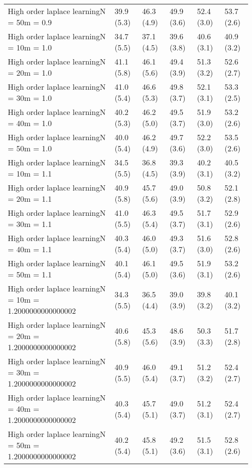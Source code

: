 \documentclass{article}
\begin{document}
\begin{table*}[t!]
\begin{center}
\begin{small}
\begin{sc}
\begin{tabular}{llllll}
High order laplace learningN = 50m = 0.9&39.9 (5.3)      &46.3 (4.9)      &49.9 (3.6)      &52.4 (3.0)      &53.7 (2.6)      \\
High order laplace learningN = 10m = 1.0&34.7 (5.5)      &37.1 (4.5)      &39.6 (3.8)      &40.6 (3.1)      &40.9 (3.2)      \\
High order laplace learningN = 20m = 1.0&41.1 (5.8)      &46.1 (5.6)      &49.4 (3.9)      &51.3 (3.2)      &52.6 (2.7)      \\
High order laplace learningN = 30m = 1.0&41.0 (5.4)      &46.6 (5.3)      &49.8 (3.7)      &52.1 (3.1)      &53.3 (2.5)      \\
High order laplace learningN = 40m = 1.0&40.2 (5.3)      &46.2 (5.0)      &49.5 (3.7)      &51.9 (3.0)      &53.2 (2.6)      \\
High order laplace learningN = 50m = 1.0&40.0 (5.4)      &46.2 (4.9)      &49.7 (3.6)      &52.2 (3.0)      &53.5 (2.6)      \\
High order laplace learningN = 10m = 1.1&34.5 (5.5)      &36.8 (4.5)      &39.3 (3.9)      &40.2 (3.1)      &40.5 (3.2)      \\
High order laplace learningN = 20m = 1.1&40.9 (5.8)      &45.7 (5.6)      &49.0 (3.9)      &50.8 (3.2)      &52.1 (2.8)      \\
High order laplace learningN = 30m = 1.1&41.0 (5.5)      &46.3 (5.4)      &49.5 (3.7)      &51.7 (3.1)      &52.9 (2.6)      \\
High order laplace learningN = 40m = 1.1&40.3 (5.4)      &46.0 (5.0)      &49.3 (3.7)      &51.6 (3.0)      &52.8 (2.6)      \\
High order laplace learningN = 50m = 1.1&40.1 (5.4)      &46.1 (5.0)      &49.5 (3.6)      &51.9 (3.1)      &53.2 (2.6)      \\
High order laplace learningN = 10m = 1.2000000000000002&34.3 (5.5)      &36.5 (4.4)      &39.0 (3.9)      &39.8 (3.2)      &40.1 (3.2)      \\
High order laplace learningN = 20m = 1.2000000000000002&40.6 (5.8)      &45.3 (5.6)      &48.6 (3.9)      &50.3 (3.3)      &51.7 (2.8)      \\
High order laplace learningN = 30m = 1.2000000000000002&40.9 (5.5)      &46.0 (5.4)      &49.1 (3.7)      &51.2 (3.2)      &52.4 (2.7)      \\
High order laplace learningN = 40m = 1.2000000000000002&40.3 (5.4)      &45.7 (5.1)      &49.0 (3.7)      &51.2 (3.1)      &52.4 (2.7)      \\
High order laplace learningN = 50m = 1.2000000000000002&40.2 (5.4)      &45.8 (5.1)      &49.2 (3.6)      &51.5 (3.1)      &52.8 (2.6)      \\

\end{tabular}
\end{sc}
\end{small}
\end{center}
\end{table*}
\end{document}
